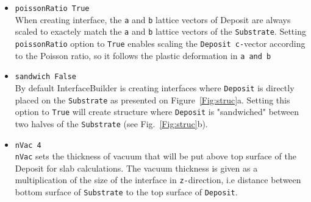 \documentclass[a4paper,12pt,oneside]{article}
\begin{document}
\begin{itemize}
\item{\texttt{poissonRatio True}}\\
When creating interface, the \texttt{a} and \texttt{b} lattice vectors of
Deposit are 
always scaled to exactely match the
\texttt{a} and \texttt{b} lattice vectors of the \texttt{Substrate}. Setting
\texttt{poissonRatio} option to \texttt{True} enables scaling the
\texttt{Deposit c-}vector according to the Poisson ratio, so it follows the
plastic deformation in \texttt{a and b}

\item{\texttt{sandwich False}}\\
By default InterfaceBuilder is creating interfaces where \texttt{Deposit} is
directly placed on the \texttt{Substrate} as presented on
Figure~\ref{Fig:struc}a. Setting this option to \texttt{True} will create
structure where \texttt{Deposit} is "sandwiched" between two halves of the
\texttt{Substrate} (see Fig.~\ref{Fig:struc}b).

\item{\texttt{nVac 4 }}\\
\texttt{nVac} sets the thickness of vacuum that will be put above top surface of
the Deposit for slab calculations. The vacuum thickness is given as a multiplication of
the size of the interface in \texttt{z-}direction, i.e distance between bottom
surface of \texttt{Substrate} to the top surface of \texttt{Deposit}.
\end{itemize}
\end{document}
